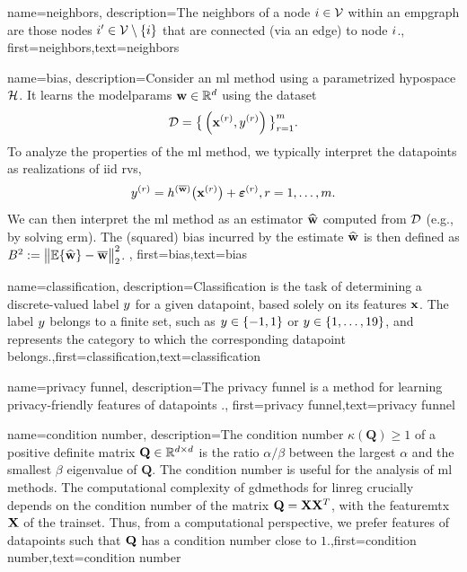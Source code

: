 {
	name={neighbors},
	description={The neighbors of a node $i \in \mathcal{V}$ 
	within an \gls{empgraph} are those nodes $i' \in \mathcal{V} \setminus \{ i\}$ that are connected (via an edge) to node $i$.},
	first={neighbors},text={neighbors} 
}

{
	name={bias},
	description={Consider an \gls{ml} method using a parametrized \gls{hypospace} $\mathcal{H}$. 
		It learns the \gls{modelparams} ${\bf w} \in \mathbb{R}^{d}$ using the \gls{dataset} $$ \mathcal{D}=\big\{ \left( {\bf x}^{(r)},y^{(r)} \right) \big\}_{r=1}^{m}.$$ 
		To analyze the properties of the \gls{ml} method, we typically interpret the \gls{datapoint}s as \gls{realization}s 
		of \gls{iid} \gls{rv}s, $$ y^{(r)} = h^{(\overline{{\bf w}})}\big( {\bf x}^{(r)} \big) + \bm{\varepsilon}^{(r)}, r=1,\ldots,m.$$ 
		We can then interpret the \gls{ml} method as an estimator $\widehat{{\bf w}}$ 
		computed from $\mathcal{D}$ (e.g., by solving \gls{erm}). The (squared) bias incurred by the estimate $\widehat{{\bf w}}$ 
		is then defined as $B^{2} := \big\| \mathbb{E} \{ \widehat{{\bf w}}  \}- \overline{{\bf w}}\big\|_{2}^{2}$. },
first={bias},text={bias} 
}

{name={classification},
 description={Classification is the task of determining a 
 	discrete-valued label $y$ for a given \gls{datapoint}, based solely on its 
 	features ${\bf x}$. The label $y$ belongs to a finite set, such as 
 	$y \in \{-1,1\}$ or $y \in \{1,\ldots,19\}$, and represents the 
 	category to which the corresponding \gls{datapoint} belongs.},first={classification},text={classification} 
}



{name={privacy funnel},
 description={The privacy funnel is a method for learning privacy-friendly \gls{feature}s 
	of \gls{datapoint}s \cite{PrivacyFunnel}.},
 first={privacy funnel},text={privacy funnel} 
}




{
	name={condition number},
	description={The condition number $\kappa(\mathbf{Q}) \geq 1$ of a 
		positive definite 
		matrix $\mathbf{Q} \in \mathbb{R}^{d \times d}$ is the ratio 
		$\alpha /\beta  $ between the 
		largest $\alpha$ and the smallest $\beta$ \gls{eigenvalue} of 
		$\mathbf{Q}$. The condition number is useful for the analysis of \gls{ml} methods. 
		The computational complexity of \gls{gdmethods} for \gls{linreg} crucially depends on the 
		condition number of the matrix $\mathbf{Q} = {\bf X} {\bf X}^{T}$, with the \gls{featuremtx} ${\bf X}$ 
		of the \gls{trainset}. Thus, from a computational perspective, we prefer \gls{feature}s of 
		\gls{datapoint}s such that $\mathbf{Q}$ has a condition number close to $1$.},first={condition number},text={condition number} 
}

